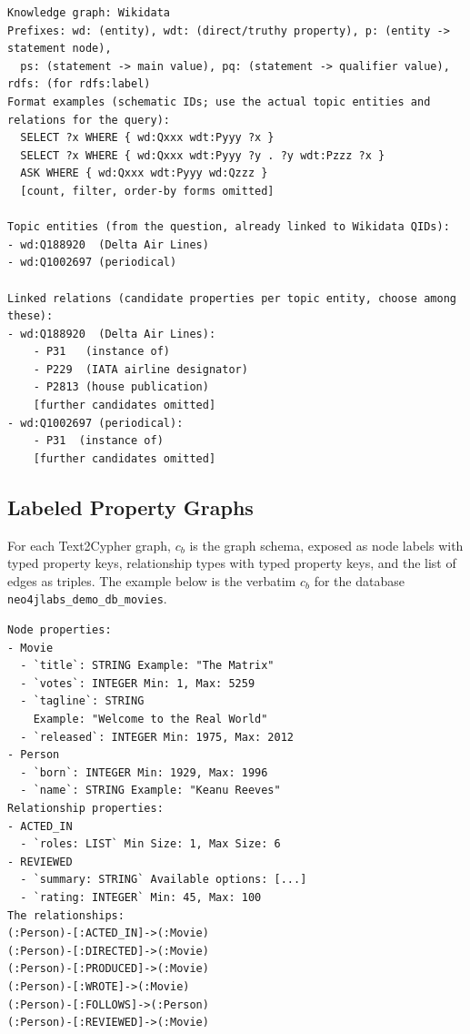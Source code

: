 \documentclass{llmxive}
\begin{document}
{\begin{tcolorbox}[colback=gray!5, colframe=gray!50, boxrule=0.5pt, arc=2mm, left=4pt, right=4pt, top=3pt, bottom=3pt]
{\footnotesize
\begin{verbatim}
Knowledge graph: Wikidata
Prefixes: wd: (entity), wdt: (direct/truthy property), p: (entity -> statement node),
  ps: (statement -> main value), pq: (statement -> qualifier value), rdfs: (for rdfs:label)
Format examples (schematic IDs; use the actual topic entities and relations for the query):
  SELECT ?x WHERE { wd:Qxxx wdt:Pyyy ?x }
  SELECT ?x WHERE { wd:Qxxx wdt:Pyyy ?y . ?y wdt:Pzzz ?x }
  ASK WHERE { wd:Qxxx wdt:Pyyy wd:Qzzz }
  [count, filter, order-by forms omitted]

Topic entities (from the question, already linked to Wikidata QIDs):
- wd:Q188920  (Delta Air Lines)
- wd:Q1002697 (periodical)

Linked relations (candidate properties per topic entity, choose among these):
- wd:Q188920  (Delta Air Lines):
    - P31   (instance of)
    - P229  (IATA airline designator)
    - P2813 (house publication)
    [further candidates omitted]
- wd:Q1002697 (periodical):
    - P31  (instance of)
    [further candidates omitted]
\end{verbatim}
}
\end{tcolorbox}

\subsection{Labeled Property Graphs}
\label{sec:appendix_context_cypher}
For each Text2Cypher graph, $c_b$ is the graph schema, exposed as node labels with typed property keys, relationship types with typed property keys, and the list of edges as triples. The example below is the verbatim $c_b$ for the database \texttt{neo4jlabs\_demo\_db\_movies}.

\begin{tcolorbox}[colback=gray!5, colframe=gray!50, boxrule=0.5pt, arc=2mm, left=4pt, right=4pt, top=3pt, bottom=3pt]
{\footnotesize
\begin{verbatim}
Node properties:
- Movie
  - `title`: STRING Example: "The Matrix"
  - `votes`: INTEGER Min: 1, Max: 5259
  - `tagline`: STRING
    Example: "Welcome to the Real World"
  - `released`: INTEGER Min: 1975, Max: 2012
- Person
  - `born`: INTEGER Min: 1929, Max: 1996
  - `name`: STRING Example: "Keanu Reeves"
Relationship properties:
- ACTED_IN
  - `roles: LIST` Min Size: 1, Max Size: 6
- REVIEWED
  - `summary: STRING` Available options: [...]
  - `rating: INTEGER` Min: 45, Max: 100
The relationships:
(:Person)-[:ACTED_IN]->(:Movie)
(:Person)-[:DIRECTED]->(:Movie)
(:Person)-[:PRODUCED]->(:Movie)
(:Person)-[:WROTE]->(:Movie)
(:Person)-[:FOLLOWS]->(:Person)
(:Person)-[:REVIEWED]->(:Movie)
\end{verbatim}
}
\end{tcolorbox}

}
\end{document}

